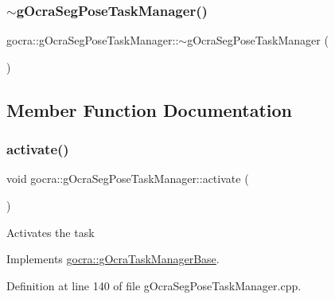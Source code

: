 \hypertarget{classgocra_1_1gOcraSegPoseTaskManager_a0873a055633adab861365426676d3fe3}{}\label{classgocra_1_1gOcraSegPoseTaskManager_a0873a055633adab861365426676d3fe3} 
\subsubsection{\texorpdfstring{$\sim$g\+Ocra\+Seg\+Pose\+Task\+Manager()}{~gOcraSegPoseTaskManager()}}
{\footnotesize\ttfamily gocra\+::g\+Ocra\+Seg\+Pose\+Task\+Manager\+::$\sim$g\+Ocra\+Seg\+Pose\+Task\+Manager (\begin{DoxyParamCaption}{ }\end{DoxyParamCaption})}



\subsection{Member Function Documentation}
\hypertarget{classgocra_1_1gOcraSegPoseTaskManager_a0fdbbb5fc40c89253fa9d9c83e8aaecc}{}\label{classgocra_1_1gOcraSegPoseTaskManager_a0fdbbb5fc40c89253fa9d9c83e8aaecc} 
\subsubsection{\texorpdfstring{activate()}{activate()}}
{\footnotesize\ttfamily void gocra\+::g\+Ocra\+Seg\+Pose\+Task\+Manager\+::activate (\begin{DoxyParamCaption}{ }\end{DoxyParamCaption})\hspace{0.3cm}{\ttfamily [virtual]}}

Activates the task 

Implements \hyperlink{classgocra_1_1gOcraTaskManagerBase_a50cf1c408749d6e9dcfaf50bcab77dee}{gocra\+::g\+Ocra\+Task\+Manager\+Base}.



Definition at line 140 of file g\+Ocra\+Seg\+Pose\+Task\+Manager.\+cpp.

